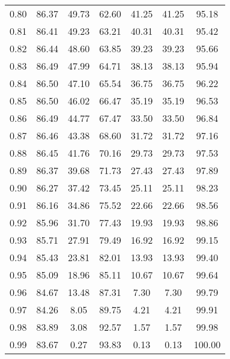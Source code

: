 \begin{tabular}{|c|c|c|c|c|c|c|}
      0.80 &     86.37 &     49.73 &      62.60 &   41.25 &      41.25 &         95.18 \\
      0.81 &     86.41 &     49.23 &      63.21 &   40.31 &      40.31 &         95.42 \\
      0.82 &     86.44 &     48.60 &      63.85 &   39.23 &      39.23 &         95.66 \\
      0.83 &     86.49 &     47.99 &      64.71 &   38.13 &      38.13 &         95.94 \\
      0.84 &     86.50 &     47.10 &      65.54 &   36.75 &      36.75 &         96.22 \\
      0.85 &     86.50 &     46.02 &      66.47 &   35.19 &      35.19 &         96.53 \\
      0.86 &     86.49 &     44.77 &      67.47 &   33.50 &      33.50 &         96.84 \\
      0.87 &     86.46 &     43.38 &      68.60 &   31.72 &      31.72 &         97.16 \\
      0.88 &     86.45 &     41.76 &      70.16 &   29.73 &      29.73 &         97.53 \\
      0.89 &     86.37 &     39.68 &      71.73 &   27.43 &      27.43 &         97.89 \\
      0.90 &     86.27 &     37.42 &      73.45 &   25.11 &      25.11 &         98.23 \\
      0.91 &     86.16 &     34.86 &      75.52 &   22.66 &      22.66 &         98.56 \\
      0.92 &     85.96 &     31.70 &      77.43 &   19.93 &      19.93 &         98.86 \\
      0.93 &     85.71 &     27.91 &      79.49 &   16.92 &      16.92 &         99.15 \\
      0.94 &     85.43 &     23.81 &      82.01 &   13.93 &      13.93 &         99.40 \\
      0.95 &     85.09 &     18.96 &      85.11 &   10.67 &      10.67 &         99.64 \\
      0.96 &     84.67 &     13.48 &      87.31 &    7.30 &       7.30 &         99.79 \\
      0.97 &     84.26 &      8.05 &      89.75 &    4.21 &       4.21 &         99.91 \\
      0.98 &     83.89 &      3.08 &      92.57 &    1.57 &       1.57 &         99.98 \\
      0.99 &     83.67 &      0.27 &      93.83 &    0.13 &       0.13 &        100.00 \\
\bottomrule
\end{tabular}
